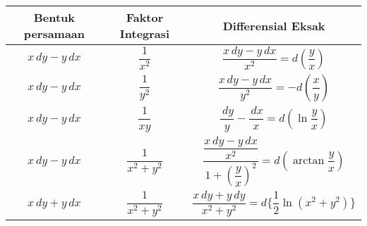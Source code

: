 \begin{enumerate}[1.]
\begin{table}[H]
\begin{tabular} { | c | c | c | }
	\hline
	Bentuk persamaan & Faktor Integrasi & Differensial Eksak \\
	\hline 
	\begin{math} x \, dy - y\, dx \end{math} & \begin{math} \dfrac{1}{x^{2}} \end{math} & \begin{math} \dfrac{x \,dy - y \, dx}{x^{2}} = d(\dfrac{y}{x}) \end{math} \\ 
	\hline
	\begin{math} x \, dy - y\, dx \end{math} & \begin{math} \dfrac{1}{y^{2}} \end{math} & \begin{math} \dfrac{x \,dy - y \, dx}{y^{2}} = -d(\dfrac{x}{y}) \end{math} \\ 
	\hline
	\begin{math} x \, dy - y\, dx \end{math} & \begin{math} \dfrac{1}{xy} \end{math} & \begin{math} \dfrac{\, dy}{y} - \dfrac{\, dx}{x} = d(\ln \dfrac{y}{x}) \end{math} \\ 
	\hline
	\begin{math} x \, dy - y\, dx \end{math} & \begin{math} \dfrac{1}{x^{2} + y^{2}} \end{math} & \begin{math}\dfrac{\dfrac{x \,dy - y \, dx}{x^{2}}}{1 + (\dfrac{y}{x})^{2}} = d(\arctan \dfrac{y}{x}) \end{math} \\
	\hline
	\begin{math} x \, dy + y\, dx \end{math} & \begin{math} \dfrac{1}{x^{2} + y^{2}} \end{math} & \begin{math}\dfrac{x \,dy + y \, dy}{x^{2} + y^{2}} = d \bigg\{ \dfrac{1}{2} \ln  (x^{2} + y^{2}) \bigg\} \end{math} \\
	\hline

	\end{tabular}

	\end{table}

\end{enumerate}

